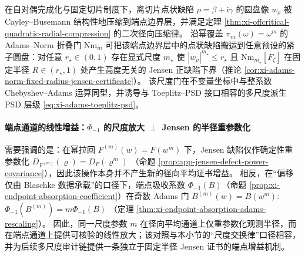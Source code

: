 \begin{theorem}\label{thm:xi-symmetry-audit-tension-scaled}
在自对偶完成化与固定切片制度下，离切片点状缺陷 \(\rho=\beta+\mathrm{i}\gamma\) 的圆盘像 \(w_\rho\) 被 Cayley--Busemann 结构性地压缩到端点边界层，并满足定理 \ref{thm:xi-offcritical-quadratic-radial-compression} 的二次径向压缩律。
沿幂覆盖 \(\pi_m(\omega)=\omega^m\) 的 Adams--Norm 折叠门 \(\mathrm{Nm}_m\) 可把该端点边界层中的点状缺陷搬运到任意预设的紧子圆盘：对任意 \(r_\star\in(0,1)\) 存在显式尺度 \(m_\star\) 使 \(|w_\rho|^{m_\star}\le r_\star\) 且 \(\mathrm{Nm}_{m_\star}[F_\zeta]\) 在固定半径 \(R\in(r_\star,1)\) 处产生高度无关的 Jensen 正缺陷下界（推论 \ref{cor:xi-adams-norm-fixed-radius-jensen-certificate}）。
该尺度门在不变量坐标中与整系数 Chebyshev--Adams 运算同型，并诱导与 Toeplitz--PSD 接口相容的多尺度派生 PSD 层级 \eqref{eq:xi-adams-toeplitz-psd}。
\end{theorem}

\paragraph{端点通道的线性增益：\texorpdfstring{$\Phi_{-1}$}{Phi-1} 的尺度放大 \texorpdfstring{$\perp$}{⊥} Jensen 的半径重参数化}
需要强调的是：在幂拉回 \(F^{(m)}(w)=F(w^m)\) 下，Jensen 缺陷仅作确定性重参数化
\(
D_{F^{(m)}}(\varrho)=D_F(\varrho^m)
\)
（命题 \ref{prop:app-jensen-defect-power-covariance}），因此该操作本身并不产生新的径向平均证书增益。
相反，在“偏移仅由 Blaschke 数据承载”的口径下，端点吸收系数 \(\Phi_{-1}(B)\)（命题 \ref{prop:xi-endpoint-absorption-coefficient}）在奇数 Adams 门
\(
B^{(m)}(w)=B(w^m)
\):
\(
\Phi_{-1}(B^{(m)})=m\Phi_{-1}(B)
\)
（定理 \ref{thm:xi-endpoint-absorption-adams-rescaling}）。
因此，同一尺度参数 \(m\) 在径向平均通道上仅重参数化观测半径，而在端点通道上提供可核验的线性放大；该对照与本小节的“尺度交换律”口径相容，并为后续多尺度审计链提供一条独立于固定半径 Jensen 证书的端点增益机制。

\endinput
